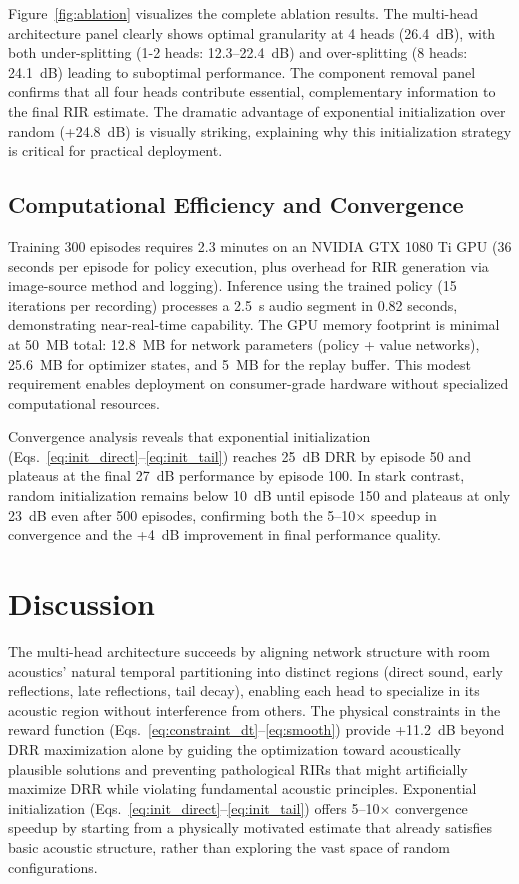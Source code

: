 \documentclass[10pt,conference]{IEEEtran}
\begin{document}
Figure~\ref{fig:ablation} visualizes the complete ablation results. The multi-head architecture panel clearly shows optimal granularity at 4 heads (26.4~dB), with both under-splitting (1-2 heads: 12.3--22.4~dB) and over-splitting (8 heads: 24.1~dB) leading to suboptimal performance. The component removal panel confirms that all four heads contribute essential, complementary information to the final RIR estimate. The dramatic advantage of exponential initialization over random (+24.8~dB) is visually striking, explaining why this initialization strategy is critical for practical deployment.

\subsection{Computational Efficiency and Convergence}

Training 300 episodes requires 2.3 minutes on an NVIDIA GTX 1080 Ti GPU (36 seconds per episode for policy execution, plus overhead for RIR generation via image-source method and logging). Inference using the trained policy (15 iterations per recording) processes a 2.5~s audio segment in 0.82 seconds, demonstrating near-real-time capability. The GPU memory footprint is minimal at 50~MB total: 12.8~MB for network parameters (policy + value networks), 25.6~MB for optimizer states, and 5~MB for the replay buffer. This modest requirement enables deployment on consumer-grade hardware without specialized computational resources.

Convergence analysis reveals that exponential initialization (Eqs.~\ref{eq:init_direct}--\ref{eq:init_tail}) reaches 25~dB DRR by episode 50 and plateaus at the final 27~dB performance by episode 100. In stark contrast, random initialization remains below 10~dB until episode 150 and plateaus at only 23~dB even after 500 episodes, confirming both the 5--10$\times$ speedup in convergence and the +4~dB improvement in final performance quality.

\section{Discussion}

The multi-head architecture succeeds by aligning network structure with room acoustics' natural temporal partitioning into distinct regions (direct sound, early reflections, late reflections, tail decay), enabling each head to specialize in its acoustic region without interference from others. The physical constraints in the reward function (Eqs.~\ref{eq:constraint_dt}--\ref{eq:smooth}) provide +11.2~dB beyond DRR maximization alone by guiding the optimization toward acoustically plausible solutions and preventing pathological RIRs that might artificially maximize DRR while violating fundamental acoustic principles. Exponential initialization (Eqs.~\ref{eq:init_direct}--\ref{eq:init_tail}) offers 5--10$\times$ convergence speedup by starting from a physically motivated estimate that already satisfies basic acoustic structure, rather than exploring the vast space of random configurations.
\end{document}
